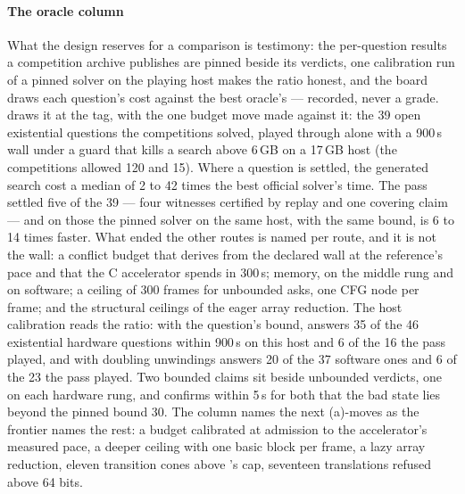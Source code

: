 \paragraph{The oracle column}
What the design reserves for a comparison is testimony: the
per-question results a competition archive publishes are pinned
beside its verdicts, one calibration run of a pinned solver on the
playing host makes the ratio honest, and the board draws each
question's cost against the best oracle's --- recorded, never a
grade.  draws it at the tag, with the one
budget move made against it: the 39 open existential questions the
competitions solved, played through  alone with a
900\,s wall under a guard that kills a search above 6\,GB on a
17\,GB host (the competitions allowed 120 and 15). Where a question
is settled, the generated search cost a median of 2 to 42 times the
best official solver's time. The pass settled five of the 39 --- four
witnesses certified by replay and one covering claim --- and on those
the pinned solver on the same host, with the same bound, is 6 to 14
times faster. What ended the other routes is named per route, and it
is not the wall: a conflict budget that derives from the declared
wall at the reference's pace and that the C accelerator spends in
300\,s; memory, on the middle rung and on software; a ceiling of 300
frames for unbounded asks, one CFG node per frame; and the structural
ceilings of the eager array reduction. The host calibration reads
the ratio: with the question's bound,  answers 35 of the
46 existential hardware questions within 900\,s on this host and 6 of
the 16 the pass played, and  with doubling unwindings
answers 20 of the 37 software ones and 6 of the 23 the pass played. Two bounded claims
sit beside unbounded verdicts, one on each hardware rung, and
 confirms within 5\,s for both that the bad state lies
beyond the pinned bound 30. The column names the
next (a)-moves as the frontier names the rest: a budget calibrated at
admission to the accelerator's measured pace, a deeper ceiling with
one basic block per frame, a lazy array reduction, eleven transition
cones above 's cap, seventeen translations refused above 64 bits.

